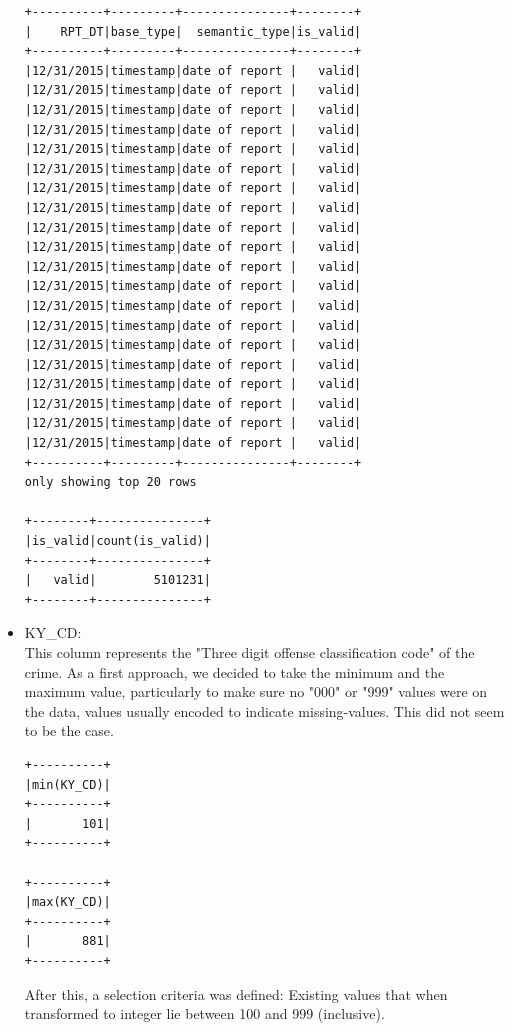 \documentclass{article}
\begin{document}
\begin{itemize}
\begin{verbatim}
+----------+---------+---------------+--------+
|    RPT_DT|base_type|  semantic_type|is_valid|
+----------+---------+---------------+--------+
|12/31/2015|timestamp|date of report |   valid|
|12/31/2015|timestamp|date of report |   valid|
|12/31/2015|timestamp|date of report |   valid|
|12/31/2015|timestamp|date of report |   valid|
|12/31/2015|timestamp|date of report |   valid|
|12/31/2015|timestamp|date of report |   valid|
|12/31/2015|timestamp|date of report |   valid|
|12/31/2015|timestamp|date of report |   valid|
|12/31/2015|timestamp|date of report |   valid|
|12/31/2015|timestamp|date of report |   valid|
|12/31/2015|timestamp|date of report |   valid|
|12/31/2015|timestamp|date of report |   valid|
|12/31/2015|timestamp|date of report |   valid|
|12/31/2015|timestamp|date of report |   valid|
|12/31/2015|timestamp|date of report |   valid|
|12/31/2015|timestamp|date of report |   valid|
|12/31/2015|timestamp|date of report |   valid|
|12/31/2015|timestamp|date of report |   valid|
|12/31/2015|timestamp|date of report |   valid|
|12/31/2015|timestamp|date of report |   valid|
+----------+---------+---------------+--------+
only showing top 20 rows

+--------+---------------+
|is_valid|count(is_valid)|
+--------+---------------+
|   valid|        5101231|
+--------+---------------+
\end{verbatim}

\item KY\_CD: \\
This column represents the "Three digit offense classification code" of the crime. As a first approach, we decided to take the minimum and the maximum value, particularly to make sure no "000" or "999" values were on the data, values usually encoded to indicate missing-values. This did not seem to be the case. 

\begin{verbatim}
+----------+
|min(KY_CD)|
+----------+
|       101|
+----------+

+----------+
|max(KY_CD)|
+----------+
|       881|
+----------+
\end{verbatim}

After this, a selection criteria was defined: Existing values that when transformed to integer lie between 100 and 999 (inclusive).


\end{itemize}
\end{document}
